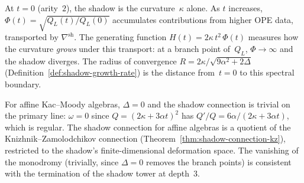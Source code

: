 \begin{remark}
\label{rem:parallel-transport-curvature}
At $t = 0$ (arity~$2$), the shadow is the curvature~$\kappa$ alone.  As $t$ increases, $\Phi(t) = \sqrt{Q_L(t)/Q_L(0)}$ accumulates contributions from higher OPE data, transported by $\nabla^{\mathrm{sh}}$.  The generating function $H(t) = 2\kappa\,t^2\,\Phi(t)$ measures how the curvature \emph{grows} under this transport: at a branch point of~$Q_L$, $\Phi \to \infty$ and the shadow diverges.  The radius of convergence $R = 2\kappa/\sqrt{9\alpha^2 + 2\Delta}$ (Definition~\ref{def:shadow-growth-rate}) is the distance from~$t = 0$ to this spectral boundary.
\end{remark}

\begin{remark}
\label{rem:shadow-connection-kz-link}
For affine Kac--Moody algebras, $\Delta = 0$ and the shadow connection is trivial on the primary line: $\omega = 0$ since $Q = (2\kappa + 3\alpha t)^2$ has $Q'/Q = 6\alpha/(2\kappa + 3\alpha t)$, which is regular.  The shadow connection for affine algebras is a quotient of the Knizhnik--Zamolodchikov connection (Theorem~\ref{thm:shadow-connection-kz}), restricted to the shadow's finite-dimensional deformation space.  The vanishing of the monodromy (trivially, since $\Delta = 0$ removes the branch points) is consistent with the termination of the shadow tower at depth~$3$.
\end{remark}

